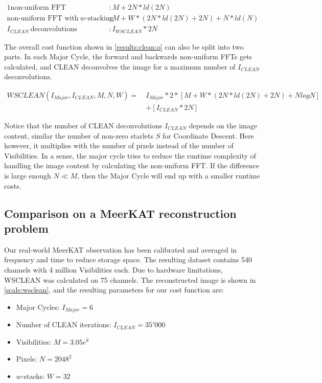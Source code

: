 \begin{alignat*}{1}
	\text{non-uniform FFT} &: M + 2N*ld(2N)\\
	\text{non-uniform FFT with} \:w\text{-stacking} &:M + W*(2N*ld(2N) + 2N) + N*ld(N)\\
	I_{CLEAN}\: \text{deconvolutions} &: I_{WSCLEAN}*2N
\end{alignat*}

The overall cost function shown in \eqref{results:clean:o} can also be split into two parts. In each Major Cycle, the forward and backwards non-uniform FFTs gets calculated, and CLEAN deconvolves the image for a maximum number of $I_{CLEAN}$ deconvolutions.

\begin{equation}\label{results:clean:o}
\begin{aligned}
 WSCLEAN(I_{Major}, I_{CLEAN}, M, N,  W) =\: &I_{Major} * 2 * [M + W*(2N*ld(2N) + 2N) + N log N]\\
	&+ [I_{CLEAN}*2N]
\end{aligned}
\end{equation}

Notice that the number of CLEAN deconvolutions $I_{CLEAN}$ depends on the image content, similar the number of non-zero starlets $S$ for Coordinate Descent. Here however, it multiplies with the number of pixels instead of the number of Visibilities. In a sense, the major cycle tries to reduce the runtime complexity of handling the image content by calculating the non-uniform FFT. If the difference is large enough $N \ll M$, then the Major Cycle will end up with a smaller runtime costs.


\subsection{Comparison on a MeerKAT reconstruction problem}
Our real-world MeerKAT observation has been calibrated and averaged in frequency and time to reduce storage space. The resulting dataset contains 540 channels with 4 million Visibilities each. Due to hardware limitations, WSCLEAN was calculated on 75 channels. The reconstructed image is shown in \ref{scale:wsclean}, and the resulting parameters for our cost function are: 
\begin{itemize}
	\item Major Cycles: $I_{Major} = 6$
	\item Number of CLEAN iterations: $I_{CLEAN} = 35'000$
	\item Visibilities: $M=3.05e^8$
		\item Pixels: $N = 2048^2$
	\item $w$-stacks: $W = 32$
\end{itemize}

